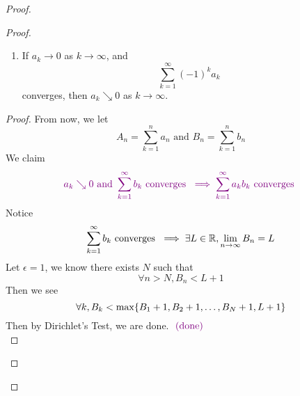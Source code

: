 \documentclass{report}
\begin{document}
\begin{proof}
\begin{proof}
\begin{question}{}{}
\begin{enumerate}
    \item If \( a_k \to 0 \) as \( k \to \infty \), and 
    \[
    \sum_{k=1}^{\infty} (-1)^k a_k
    \]
    converges, then \( a_k \searrow 0 \) as \( k \to \infty \).
\end{enumerate}
\end{question}
\begin{proof}
From now, we let 
\begin{equation}
A_n=\sum_{k=1}^n a_n\text{ and }B_n=\sum_{k=1}^n b_n
\end{equation}
We claim
\begin{equation}
  \textcolor{violet}{a_k\searrow 0\text{ and }\sum_{k=1}^\infty b_k\text{ converges }\implies \sum_{k=1}^\infty a_kb_k\text{ converges }}
\end{equation}
Notice 
\begin{equation}
\sum_{k=1}^\infty b_k\text{ converges }\implies \exists L\in\mathbb{R}, \lim_{n\to\infty}B_n=L
\end{equation}
Let $\epsilon =1$, we know there exists $N$ such that  
\begin{equation}
\forall n>N, B_n<L+1
\end{equation}
Then we see 
\begin{equation}
\forall k, B_k<\max \{ B_1+1,B_2+1,\dots ,B_{N}+1,L+1 \}
\end{equation}
Then by Dirichlet's Test, we are done. $\textcolor{violet}{\text{ (done) }}$\\


\end{proof}
\end{proof}
\end{proof}
\end{document}
